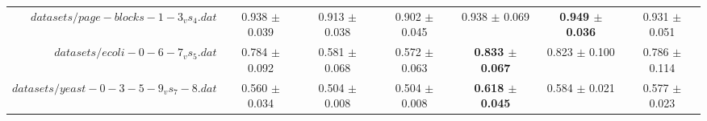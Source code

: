 \begin{table}[!ht]
{\begin{tabular}{r c c c c c c}
$datasets/page-blocks-1-3_vs_4.dat$ & 0.938 $\pm$ 0.039 & 0.913 $\pm$ 0.038 & 0.902 $\pm$ 0.045 & 0.938 $\pm$ 0.069 & \textbf{0.949 $\pm$ 0.036} & 0.931 $\pm$ 0.051 \\
$datasets/ecoli-0-6-7_vs_5.dat$ & 0.784 $\pm$ 0.092 & 0.581 $\pm$ 0.068 & 0.572 $\pm$ 0.063 & \textbf{0.833 $\pm$ 0.067} & 0.823 $\pm$ 0.100 & 0.786 $\pm$ 0.114 \\
$datasets/yeast-0-3-5-9_vs_7-8.dat$ & 0.560 $\pm$ 0.034 & 0.504 $\pm$ 0.008 & 0.504 $\pm$ 0.008 & \textbf{0.618 $\pm$ 0.045} & 0.584 $\pm$ 0.021 & 0.577 $\pm$ 0.023 \\
\end{tabular}}
\end{table}
